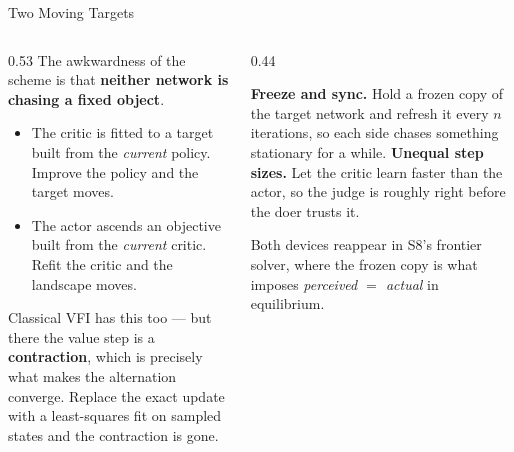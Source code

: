 \begin{frame}{Two Moving Targets}
\begin{columns}[T]
\begin{column}{0.53\textwidth}
\small
The awkwardness of the scheme is that \textbf{neither network is chasing a fixed object}.
\medskip
\begin{itemize}\small\setlength{\itemsep}{1.1mm}
  \item The critic is fitted to a target built from the \emph{current} policy. Improve the policy and the target moves.
  \item The actor ascends an objective built from the \emph{current} critic. Refit the critic and the landscape moves.
\end{itemize}
\medskip

Classical VFI has this too --- but there the value step is a \textbf{contraction}, which is precisely what makes the alternation converge. Replace the exact update with a least-squares fit on sampled states and the contraction is gone.
\end{column}
\begin{column}{0.44\textwidth}
\begin{takeawaybox}[title=\textbf{What is done in practice}]\small
\textbf{Freeze and sync.} Hold a frozen copy of the target network and refresh it every $n$ iterations, so each side chases something stationary for a while.
\medskip
\textbf{Unequal step sizes.} Let the critic learn faster than the actor, so the judge is roughly right before the doer trusts it.
\end{takeawaybox}
\medskip
\begin{examplebox}\footnotesize
Both devices reappear in S8's frontier solver, where the frozen copy is what imposes \emph{perceived $=$ actual} in equilibrium.
\end{examplebox}
\end{column}
\end{columns}
\end{frame}

